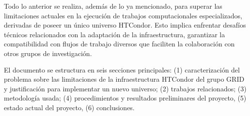 Todo lo anterior se realiza, además de lo ya mencionado, para superar las limitaciones actuales en la ejecución de trabajos computacionales especializados, derivadas de poseer un único universo HTCondor. Esto implica enfrentar desafíos técnicos relacionados con la adaptación de la infraestructura, garantizar la compatibilidad con flujos de trabajo diversos que faciliten la colaboración con otros grupos de investigación. 

El documento se estructura en seis secciones principales: (1) caracterización del problema sobre las limitaciones de la infraestructura HTCondor del grupo GRID y justificación para implementar un nuevo universo; (2) trabajos relacionados; (3) metodología usada; (4) procedimientos y resultados preliminares del proyecto, (5) estado actual del proyecto, (6) conclusiones.
